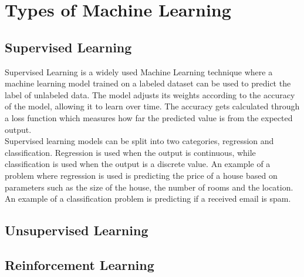 \section{Types of Machine Learning}\label{sec:ml-types}

\subsection{Supervised Learning}\label{sec:supervised-learning}
Supervised Learning is a widely used Machine Learning technique where a machine learning model trained 
on a labeled dataset can be used to predict the label of unlabeled data. The model adjusts its weights 
according to the accuracy of the model, allowing it to learn over time. The accuracy gets calculated through
a loss function which measures how far the predicted value is from the expected output. \cite{ml_supervised_learning}
\\
Supervised learning models can be split into two categories, regression and classification. Regression is used when
the output is continuous, while classification is used when the output is a discrete value. An example of a problem
where regression is used is predicting the price of a house based on parameters such as the size of the house, the number of rooms and the location.
An example of a classification problem is predicting if a received email is spam. \cite{ml_reg_vs_class}

\subsection{Unsupervised Learning}\label{sec:unsupervised-learning}

\subsection{Reinforcement Learning}\label{sec:reinforcement-learning}